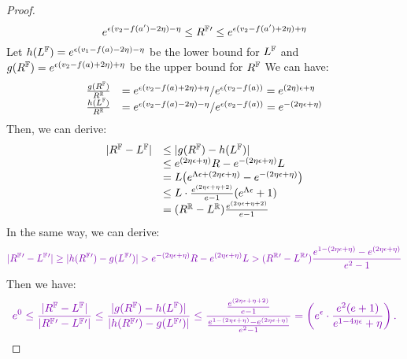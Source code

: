 \documentclass[a4paper,11pt]{article}
\begin{document}
\begin{proof}
{		%
		$$ 
		e^{\epsilon 
		 (v_2 - f(a') - 2\eta) - \eta}
		\leq R^{\mathbb{F}}{'} \leq
		e^{\epsilon 
		(v_2 - f(a') + 2\eta) + \eta}$$
%
		Let  
		$h{(L^{\mathbb{F}}) } = e^{\epsilon 
		 (v_1 - f(a) - 2\eta) - \eta}$ 
		 be the lower bound for $L^{\mathbb{F}}$
		and $g(R^{\mathbb{F}}) = e^{\epsilon 
		(v_2 - f(a) + 2\eta) + \eta}$ 
		be the upper bound for $R^{\mathbb{F}}$
		We can have:
		\[
		\begin{array}{ll}
		\frac{g(\fvalR)}{\rvarR} 
		& = e^{\epsilon 
		(\valv_2 - f(a) + 2\eta) + \eta}/e^{\epsilon(\valv_2 - f(a))}
		 =
		e^{ 
		(2\eta)\epsilon + \eta}
		\\
%
		\frac{h(\fvalL )}{\rvarR} 
		& = e^{\epsilon 
		(\valv_2 - f(a) - 2\eta) - \eta}/e^{\epsilon(\valv_2 - f(a))}
		 =
		e^{ 
		-(2\eta\epsilon + \eta)}
		\end{array}
		\]
		Then, we can derive:
		\[
		\begin{array}{ll}
		|R^{\mathbb{F}} - L^{\mathbb{F}}|
		& \leq |g(R^{\mathbb{F}} ) - h(L^{\mathbb{F}} )| \\
		& \leq e^{ 
		(2\eta \epsilon + \eta)}R - 
		e^{-(2\eta\epsilon + \eta)} L \\
		& = L \big(  e^{ \Lambda\epsilon + (2\eta \epsilon + \eta)} 
		- e^{-(2\eta \epsilon + \eta)} \big)\\
		& \leq L \cdot
		\frac{e^{(2\eta \epsilon + \eta + 2)}}
		{e - 1}
		(e^{ \Lambda\epsilon} + 1) \\
		& = (R^{\mathbb{R}} - L^{\mathbb{R}})
		\frac{e^{(2\eta \epsilon + \eta + 2)}}
		{e - 1}
		\end{array}
		\]
		In the same way, we can derive:
		\[
		\extend{
		|\fvarR{'} - \fvalL{'}|
		\geq 
		|h(\fvalR{'} ) - g(\fvalL{'} )|
		 > e^{-(2\eta \epsilon + \eta)} R 
		 - e^{(2\eta \epsilon + \eta)} L
		> (\rvalR{'} - \rvalL{'})
		\frac{e^{1 - (2\eta \epsilon + \eta)} - e^{(2\eta \epsilon + \eta)}}
		{e^2 - 1}
		}
		\]
		Then we have:
		\[
		\extend{
		e^0 \leq 
		\frac{|\fvalR - \fvalL |}
		{|\fvalR{'} - \fvalL{'}|}
		\leq
		\frac{|g(\fvalR ) - h(\fvalL )|}
		{|h(\fvalR{'} ) - g(\fvalL{'} )|}
		\leq 
		\frac{\frac{e^{(2\eta \epsilon + \eta + 2)}}
		{e - 1}}
		{\frac{e^{1 - (2\eta \epsilon + \eta)} - e^{(2\eta \epsilon + \eta)}}
		{e^2 - 1}}
		=
		\left(e^{\epsilon} \cdot
		\frac{e^2(e + 1)}{e^{1 - 4\eta \epsilon} + \eta} 
		\right).
		}		
		\]
		}
%
\end{proof}




\newpage


\end{document}
